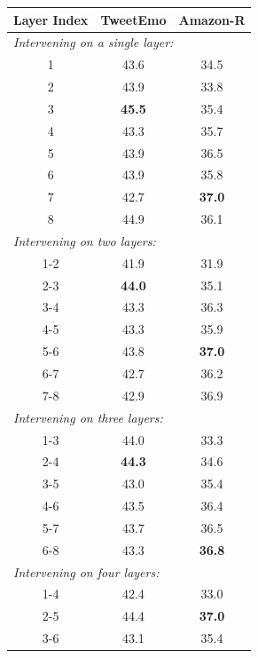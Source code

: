 \documentclass[11pt]{article}
\begin{document}
\begin{table}[t]
    \centering
    \setlength{\tabcolsep}{8pt}
    \begin{tabular}{ccc}
        \toprule
        \textbf{Layer Index} & \textbf{TweetEmo} & \textbf{Amazon-R} \\
        \midrule
        \multicolumn{3}{l}{\it{Intervening on a single layer:}}\\
        1  & 43.6 & 34.5  \\
        2  & 43.9 & 33.8  \\
        3 & \textbf{45.5}             & 35.4        \\
        4 & 43.3              & 35.7       \\
        5 & 43.9           & 36.5        \\
        6 & 43.9             & 35.8         \\
        7 & 42.7             & \textbf{37.0}        \\
        8 & 44.9             & 36.1       \\
        \midrule
        \multicolumn{3}{l}{\it{Intervening on two layers:}}\\
        1-2 & 41.9 & 31.9 \\
        2-3 & \textbf{44.0} & 35.1 \\
        3-4 & 43.3 & 36.3 \\
        4-5 & 43.3 & 35.9 \\
        5-6 & 43.8 & \textbf{37.0} \\
        6-7 & 42.7 & 36.2 \\
        7-8 & 42.9 & 36.9 \\
        \midrule
        \multicolumn{3}{l}{\it{Intervening on three layers:}}\\
        1-3 & 44.0 & 33.3 \\
        2-4 & \textbf{44.3} & 34.6 \\
        3-5 & 43.0 & 35.4 \\
        4-6 & 43.5 & 36.4 \\
        5-7 & 43.7 & 36.5 \\
        6-8 & 43.3 & \textbf{36.8} \\
        \midrule
        \multicolumn{3}{l}{\it{Intervening on four layers:}}\\
        1-4 & 42.4 & 33.0 \\
        2-5 & 44.4 & \textbf{37.0} \\
        3-6 & 43.1 & 35.4 \\

\end{tabular}
\end{table}
\end{document}
